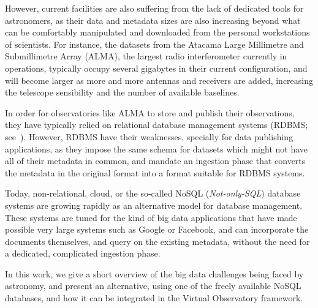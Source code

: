 However, current facilities are also suffering from the lack of dedicated tools for astronomers, as their data and metadata sizes are also increasing beyond what can be comfortably manipulated and downloaded from the personal workstations of scientists. For instance, the datasets from the Atacama Large Millimetre and Submillimetre Array (ALMA), the largest radio interferometer currently in operations, typically occupy several gigabytes in their current configuration, and will become larger as more and more antennas and receivers are %
added, increasing the telescope sensibility and the number of available baselines.

In order for observatories like ALMA to store and publish their observations, they have typically relied on relational database management systems (RDBMS; see~\cite{Silberschatz_01}). However, RDBMS have their weaknesses, specially for data publishing applications, as they impose the same schema for datasets which might not have all of their metadata in common, and mandate an ingestion phase that converts the metadata in the original format into a format suitable for RDBMS systems.

Today, non-relational, cloud, or the so-called NoSQL (\emph{Not-only-SQL}) database systems
are growing rapidly as an alternative model for database management. These systems are tuned for the kind of big data applications that have made possible very large systems such as Google or Facebook, and can incorporate the documents themselves, and query on the existing metadata, without the need for a dedicated, complicated ingestion phase.


In this work, we give a short overview of
the
big data 
challenges being faced by astronomy, %
and present an alternative, using one of the
freely available %
NoSQL databases, 
and how it can be integrated in the Virtual Observatory framework.